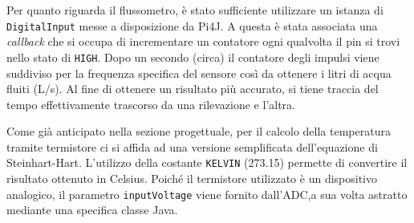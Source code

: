 %
Per quanto riguarda il flussometro, è stato sufficiente utilizzare un istanza di \texttt{DigitalInput} messe a disposizione da Pi4J. A questa è stata associata una \textit{callback} che si occupa di incrementare un contatore ogni qualvolta il pin si trovi nello stato di \texttt{HIGH}. Dopo un secondo (circa) il contatore degli impulsi viene suddiviso per la frequenza specifica del sensore così da ottenere i litri di acqua fluiti (L/s). Al fine di ottenere un risultato più accurato, si tiene traccia del tempo effettivamente trascorso da una rilevazione e l'altra.

%
Come già anticipato nella sezione progettuale, per il calcolo della temperatura tramite termistore ci si affida ad una versione semplificata dell'equazione di Steinhart-Hart. L'utilizzo della costante \texttt{KELVIN} (273.15) permette di convertire il risultato ottenuto in Celsius. Poiché il termistore utilizzato è un dispositivo analogico, il parametro \texttt{inputVoltage} viene fornito dall'ADC,a sua volta astratto mediante una specifica classe Java.

\newpage